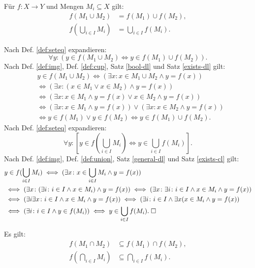\begin{Satz}\newlinefirst
Für $f\colon X\to Y$ und Mengen $M_i\subseteq X$ gilt:
\begin{align}
f(M_1\cup M_2) &= f(M_1)\cup f(M_2),\\
f(\bigcup_{i\in I} M_i) &= \bigcup_{i\in I} f(M_i).
\end{align}
\end{Satz}
\begin{Beweis}
Nach Def. \ref{def:seteq} expandieren:
\[\forall y\colon (y\in f(M_1\cup M_2)\iff y\in f(M_1)\cup f(M_2)).\]
Nach Def. \ref{def:img}, Def. \ref{def:cup},
Satz \ref{bool-dl} und Satz \ref{exists-dl} gilt:
\begin{align*}
&y\in f(M_1\cup M_2) \iff (\exists x\colon x\in M_1\cup M_2\land y=f(x))\\
&\iff (\exists x\colon (x\in M_1\lor x\in M_2)\land y=f(x))\\
&\iff (\exists x\colon x\in M_1\land y=f(x)\lor x\in M_2\land y=f(x))\\
&\iff (\exists x\colon x\in M_1\land y=f(x))\lor (\exists x\colon x\in M_2\land y=f(x))\\
&\iff y\in f(M_1)\lor y\in f(M_2) \iff y\in f(M_1)\cup f(M_2).
\end{align*}
Nach Def. \ref{def:seteq} expandieren:
\[\forall y\colon [y\in f(\bigcup_{i\in I} M_i)\iff y\in \bigcup_{i\in I} f(M_i)].\]
Nach Def. \ref{def:img}, Def. \ref{def:union},
Satz \ref{general-dl} und Satz \ref{exists-cl} gilt:
\begin{align*}
& y\in f(\bigcup_{i\in I} M_i)
\iff (\exists x\colon x\in\bigcup_{i\in I} M_i\land y=f(x))\\
&\iff (\exists x\colon (\exists i\colon i\in I\land x\in M_i)\land y=f(x))
\iff (\exists x\colon \exists i\colon i\in I\land x\in M_i\land y=f(x))\\
&\iff (\exists i\exists x\colon i\in I\land x\in M_i\land y=f(x))
\iff (\exists i\colon i\in I\land\exists x(x\in M_i\land y=f(x))\\
&\iff (\exists i\colon i\in I\land y\in f(M_i))
\iff y\in\bigcup_{i\in I} f(M_i).\;\square
\end{align*}
\end{Beweis}

\begin{Satz}\label{img-cap-semi-dl}
Es gilt:
\begin{align}
f(M_1\cap M_2) &\subseteq f(M_1)\cap f(M_2),\\
f(\bigcap_{i\in I} M_i) &\subseteq \bigcap_{i\in I} f(M_i).
\end{align}
\end{Satz}


